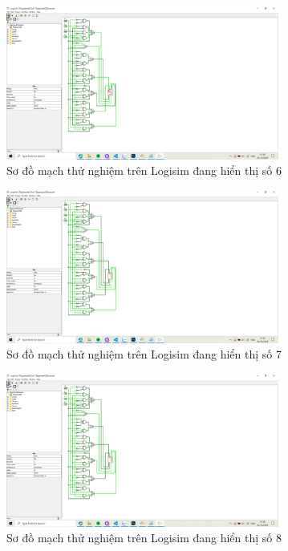 \begin{figure}[H]
	\centering
	\includegraphics[width=0.8\textwidth]{images/6.PNG}
	\caption{Sơ đồ mạch thử nghiệm trên Logisim đang hiển thị số 6}
	\label{fig:circuitDesign}
\end{figure}

\begin{figure}[H]
	\centering
	\includegraphics[width=0.8\textwidth]{images/7.PNG}
	\caption{Sơ đồ mạch thử nghiệm trên Logisim đang hiển thị số 7}
	\label{fig:circuitDesign}
\end{figure}

\begin{figure}[H]
	\centering
	\includegraphics[width=0.8\textwidth]{images/8.PNG}
	\caption{Sơ đồ mạch thử nghiệm trên Logisim đang hiển thị số 8}
	\label{fig:circuitDesign}
\end{figure}

